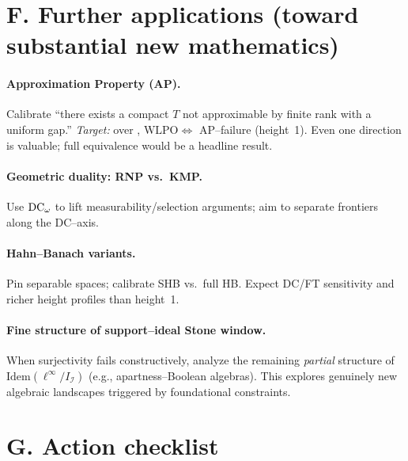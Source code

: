 \documentclass[11pt]{article}
\theoremstyle{definition}
\theoremstyle{remark}
\newcommand{\linf}{\ell^\infty}
\newcommand{\WLPO}{\mathrm{WLPO}}
\newcommand{\BISH}{\mathrm{BISH}}
\begin{document}
\section{F. Further applications (toward substantial new mathematics)}

\paragraph{Approximation Property (AP).}
Calibrate ``there exists a compact $T$ not approximable by finite rank with a uniform gap.''  
\emph{Target:} over \BISH, $\WLPO \Leftrightarrow$ AP–failure (height~1). Even one direction is valuable; full equivalence would be a headline result.

\paragraph{Geometric duality: RNP vs.\ KMP.}
Use \(\mathrm{DC}_\omega\) to lift measurability/selection arguments; aim to separate frontiers along the DC–axis.

\paragraph{Hahn–Banach variants.}
Pin separable spaces; calibrate SHB vs.\ full HB. Expect DC/FT sensitivity and richer height profiles than height~1.

\paragraph{Fine structure of support–ideal Stone window.}
When surjectivity fails constructively, analyze the remaining \emph{partial} structure of $\mathrm{Idem}(\linf/I_{\mathcal I})$ (e.g., apartness–Boolean algebras). This explores genuinely new algebraic landscapes triggered by foundational constraints.

\section{G. Action checklist}
\end{document}
